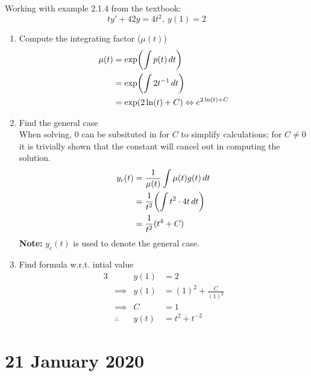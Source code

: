 \documentclass[twoside]{report}
\begin{document}
    \begin{example}
        Working with example 2.1.4 from the textbook:
        \begin{equation}
            ty' +4 2y = 4 t^{2},\ y(1) = 2
        \end{equation}
        \begin{enumerate}
            \item Compute the integrating factor ($\mu(t)$)
                \begin{align}
                    \mu(t) &= \exp\bbbp{\int p(t)\,dt}\\
                    &= \exp\bbbp{\int 2 t^{-1}\,dt}\\
                    &= \exp\bp{2\ln(t) + C} \Leftrightarrow e^{2\ln(t) + C}
                \end{align}
            \item Find the general case\\
                When solving, $0$ can be subsituted in for $C$ to simplify calculations; for $C \neq 0$ it is trivially shown that the constant will cancel out in computing the solution.
                \begin{align}
                    y_c(t) &= \frac{1}{\mu(t)}\int \mu(t)g(t)\,dt\\
                    &= \frac{1}{t^{2}}\bbbp{\int t^{2}\cdot 4t\,dt}\\
                    &= \frac{1}{t^{2}}(t^{4} + C)
                \end{align}
                \textbf{Note:} $y_c(t)$ is used to denote the general case.
            \item Find formula w.r.t. intial value
                \begin{alignat}{3}
                    &&y(1) &= 2\\
                    &\implies &y(1) &= (1)^{2} + \frac{C}{(1)^{2}}\\
                    &\implies &C &= 1\\
                    &\therefore &y(t) &= t^{2} + t^{-2}
                \end{alignat}
        \end{enumerate}
    \end{example}
    \chapter{21 January 2020}
\end{document}
